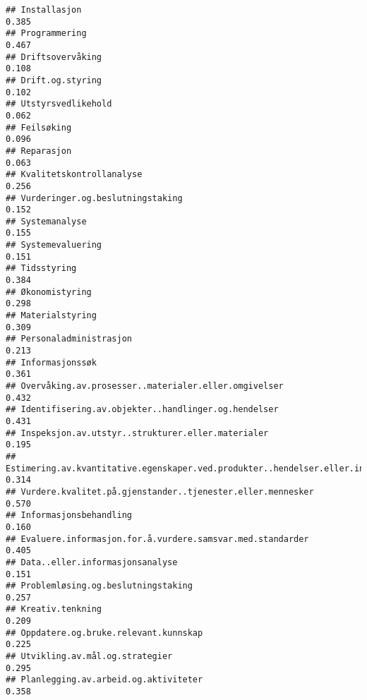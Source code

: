 \documentclass[
]{article}
\begin{document}
\begin{verbatim}
## Installasjon                                                                     0.385
## Programmering                                                                    0.467
## Driftsovervåking                                                                 0.108
## Drift.og.styring                                                                 0.102
## Utstyrsvedlikehold                                                               0.062
## Feilsøking                                                                       0.096
## Reparasjon                                                                       0.063
## Kvalitetskontrollanalyse                                                         0.256
## Vurderinger.og.beslutningstaking                                                 0.152
## Systemanalyse                                                                    0.155
## Systemevaluering                                                                 0.151
## Tidsstyring                                                                      0.384
## Økonomistyring                                                                   0.298
## Materialstyring                                                                  0.309
## Personaladministrasjon                                                           0.213
## Informasjonssøk                                                                  0.361
## Overvåking.av.prosesser..materialer.eller.omgivelser                             0.432
## Identifisering.av.objekter..handlinger.og.hendelser                              0.431
## Inspeksjon.av.utstyr..strukturer.eller.materialer                                0.195
## Estimering.av.kvantitative.egenskaper.ved.produkter..hendelser.eller.informasjon 0.314
## Vurdere.kvalitet.på.gjenstander..tjenester.eller.mennesker                       0.570
## Informasjonsbehandling                                                           0.160
## Evaluere.informasjon.for.å.vurdere.samsvar.med.standarder                        0.405
## Data..eller.informasjonsanalyse                                                  0.151
## Problemløsing.og.beslutningstaking                                               0.257
## Kreativ.tenkning                                                                 0.209
## Oppdatere.og.bruke.relevant.kunnskap                                             0.225
## Utvikling.av.mål.og.strategier                                                   0.295
## Planlegging.av.arbeid.og.aktiviteter                                             0.358

\end{verbatim}
\end{document}
